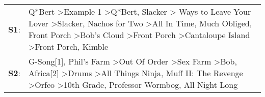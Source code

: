 \begin{supertabular}{p{0.03\textwidth}p{0.92\textwidth}}
 \textbf{S1}:  &  Q*Bert\textsuperscript{} \textgreater \enspace Example 1\textsuperscript{} \textgreater \enspace Q*Bert\textsuperscript{}, \enspace Slacker\textsuperscript{} \textgreater {} Ways to Leave Your Lover\textsuperscript{} \textgreater \enspace Slacker\textsuperscript{}, \enspace Nachos for Two\textsuperscript{} \textgreater \enspace All In Time\textsuperscript{}, \enspace Much Obliged\textsuperscript{}, \enspace Front Porch\textsuperscript{} \textgreater \enspace Bob's Cloud\textsuperscript{} \textgreater \enspace Front Porch\textsuperscript{} \textgreater \enspace Cantaloupe Island\textsuperscript{} \textgreater \enspace Front Porch\textsuperscript{}, \enspace Kimble\textsuperscript{}  \enspace  \\
 \textbf{S2}:  &                                                                                                               G-Song[1]\textsuperscript{}, \enspace Phil's Farm\textsuperscript{} \textgreater \enspace Out Of Order\textsuperscript{} \textgreater \enspace Sex Farm\textsuperscript{} \textgreater \enspace Bob\textsuperscript{}, \enspace Africa[2]\textsuperscript{} \textgreater \enspace Drums\textsuperscript{} \textgreater \enspace All Things Ninja\textsuperscript{}, \enspace Muff II: The Revenge\textsuperscript{} \textgreater \enspace Orfeo\textsuperscript{} \textgreater \enspace 10th Grade\textsuperscript{}, \enspace Professor Wormbog\textsuperscript{}, \enspace All Night Long\textsuperscript{}  \enspace  \\
\end{supertabular}
